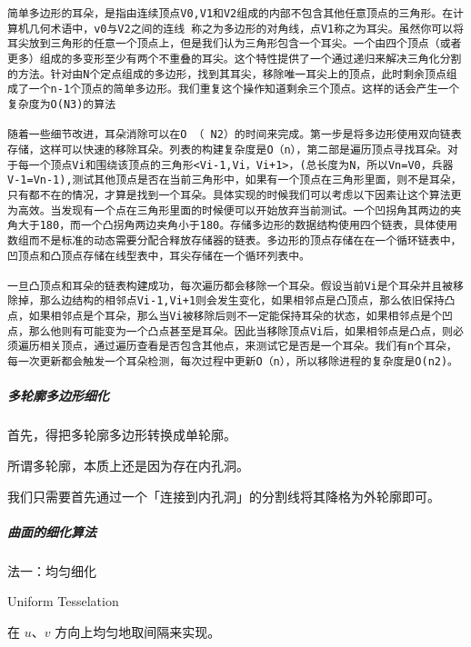 \documentclass[
]{article}
\begin{document}
\begin{verbatim}
简单多边形的耳朵，是指由连续顶点V0,V1和V2组成的内部不包含其他任意顶点的三角形。在计算机几何术语中，v0与V2之间的连线 称之为多边形的对角线，点V1称之为耳尖。虽然你可以将耳尖放到三角形的任意一个顶点上，但是我们认为三角形包含一个耳尖。一个由四个顶点（或者更多）组成的多变形至少有两个不重叠的耳尖。这个特性提供了一个通过递归来解决三角化分割的方法。针对由N个定点组成的多边形，找到其耳尖，移除唯一耳尖上的顶点，此时剩余顶点组成了一个n-1个顶点的简单多边形。我们重复这个操作知道剩余三个顶点。这样的话会产生一个复杂度为O(N3)的算法

随着一些细节改进，耳朵消除可以在O （ N2）的时间来完成。第一步是将多边形使用双向链表存储，这样可以快速的移除耳朵。列表的构建复杂度是O（n），第二部是遍历顶点寻找耳朵。对于每一个顶点Vi和围绕该顶点的三角形<Vi-1,Vi，Vi+1>，(总长度为N，所以Vn=V0，兵器V-1=Vn-1),测试其他顶点是否在当前三角形中，如果有一个顶点在三角形里面，则不是耳朵，只有都不在的情况，才算是找到一个耳朵。具体实现的时候我们可以考虑以下因素让这个算法更为高效。当发现有一个点在三角形里面的时候便可以开始放弃当前测试。一个凹拐角其两边的夹角大于180，而一个凸拐角两边夹角小于180。存储多边形的数据结构使用四个链表，具体使用数组而不是标准的动态需要分配合释放存储器的链表。多边形的顶点存储在在一个循环链表中，凹顶点和凸顶点存储在线型表中，耳尖存储在一个循环列表中。

一旦凸顶点和耳朵的链表构建成功，每次遍历都会移除一个耳朵。假设当前Vi是个耳朵并且被移除掉，那么边结构的相邻点Vi-1,Vi+1则会发生变化，如果相邻点是凸顶点，那么依旧保持凸点，如果相邻点是个耳朵，那么当Vi被移除后则不一定能保持耳朵的状态，如果相邻点是个凹点，那么他则有可能变为一个凸点甚至是耳朵。因此当移除顶点Vi后，如果相邻点是凸点，则必须遍历相关顶点，通过遍历查看是否包含其他点，来测试它是否是一个耳朵。我们有n个耳朵，每一次更新都会触发一个耳朵检测，每次过程中更新O（n），所以移除进程的复杂度是O(n2)。
\end{verbatim}

\hypertarget{header-n88}{%
\subparagraph{多轮廓多边形细化}\label{header-n88}}

首先，得把多轮廓多边形转换成单轮廓。

所谓多轮廓，本质上还是因为存在内孔洞。

我们只需要首先通过一个「连接到内孔洞」的分割线将其降格为外轮廓即可。

\hypertarget{header-n92}{%
\subparagraph{曲面的细化算法}\label{header-n92}}

法一：均匀细化

Uniform Tesselation

在 \(u\)、\(v\) 方向上均匀地取间隔来实现。
\end{document}
